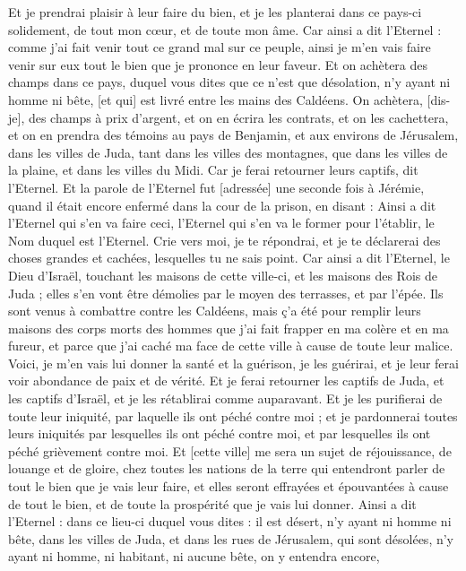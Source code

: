 \begin{multicols}{2}
Et je prendrai plaisir à leur faire du bien, et je les planterai dans ce pays-ci solidement, de tout mon cœur, et de toute mon âme.
Car ainsi a dit l'Eternel : comme j'ai fait venir tout ce grand mal sur ce peuple, ainsi je m'en vais faire venir sur eux tout le bien que je prononce en leur faveur.
Et on achètera des champs dans ce pays, duquel vous dites que ce n'est que désolation, n'y ayant ni homme ni bête, [et qui] est livré entre les mains des Caldéens.
On achètera, [dis-je], des champs à prix d'argent, et on en écrira les contrats, et on les cachettera, et on en prendra des témoins au pays de Benjamin, et aux environs de Jérusalem, dans les villes de Juda, tant dans les villes des montagnes, que dans les villes de la plaine, et dans les villes du Midi. Car je ferai retourner leurs captifs, dit l'Eternel.
\VerseOne{}Et la parole de l'Eternel fut [adressée] une seconde fois à Jérémie, quand il était encore enfermé dans la cour de la prison, en disant :
Ainsi a dit l'Eternel qui s'en va faire ceci, l'Eternel qui s'en va le former pour l'établir, le Nom duquel est l'Eternel.
Crie vers moi, je te répondrai, et je te déclarerai des choses grandes et cachées, lesquelles tu ne sais point.
Car ainsi a dit l'Eternel, le Dieu d'Israël, touchant les maisons de cette ville-ci, et les maisons des Rois de Juda ; elles s'en vont être démolies par le moyen des terrasses, et par l'épée.
Ils sont venus à combattre contre les Caldéens, mais ç'a été pour remplir leurs maisons des corps morts des hommes que j'ai fait frapper en ma colère et en ma fureur, et parce que j'ai caché ma face de cette ville à cause de toute leur malice.
Voici, je m'en vais lui donner la santé et la guérison, je les guérirai, et je leur ferai voir abondance de paix et de vérité.
Et je ferai retourner les captifs de Juda, et les captifs d'Israël, et je les rétablirai comme auparavant.
Et je les purifierai de toute leur iniquité, par laquelle ils ont péché contre moi ; et je pardonnerai toutes leurs iniquités par lesquelles ils ont péché contre moi, et par lesquelles ils ont péché grièvement contre moi.
Et [cette ville] me sera un sujet de réjouissance, de louange et de gloire, chez toutes les nations de la terre qui entendront parler de tout le bien que je vais leur faire, et elles seront effrayées et épouvantées à cause de tout le bien, et de toute la prospérité que je vais lui donner.
Ainsi a dit l'Eternel : dans ce lieu-ci duquel vous dites : il est désert, n'y ayant ni homme ni bête, dans les villes de Juda, et dans les rues de Jérusalem, qui sont désolées, n'y ayant ni homme, ni habitant, ni aucune bête, on y entendra encore,

\end{multicols}
